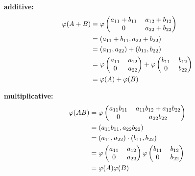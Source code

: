 \begin{enumerate}
      \textbf{additive:}
      \begin{align*}
         \varphi(A + B) &= \varphi\left(\begin{tabular}{@{}cc@{}}
            $a_{11} + b_{11}$ & $a_{12} + b_{12}$ \\
            0  & $a_{22} + b_{22}$
         \end{tabular}\right) \\
         &= (a_{11} + b_{11}, a_{22} + b_{22}) \\
         &= (a_{11}, a_{22}) + (b_{11}, b_{22}) \\
         &= \varphi\left(\begin{tabular}{@{}cc@{}}
            $a_{11}$ & $a_{12}$ \\
            0 & $a_{22}$
         \end{tabular}\right) + \varphi\left(\begin{tabular}{@{}cc@{}}
            $b_{11}$ & $b_{12}$ \\
            0 & $b_{22}$
         \end{tabular}\right) \\
         &= \varphi(A) + \varphi(B)
      \end{align*}
      
      \textbf{multiplicative:}
      \begin{align*}
         \varphi(AB) &= \varphi\left(\begin{tabular}{@{}cc@{}}
            $a_{11}b_{11}$ & $a_{11}b_{12} + a_{12}b_{22}$  \\
            0  & $a_{22}b_{22}$
         \end{tabular}\right) \\
         &= (a_{11}b_{11}, a_{22}b_{22}) \\
         &= (a_{11}, a_{22}) \cdot (b_{11}, b_{22}) \\
         &= \varphi\left(\begin{tabular}{@{}cc@{}}
            $a_{11}$ & $a_{12}$ \\
            0 & $a_{22}$
         \end{tabular}\right)\varphi\left(\begin{tabular}{@{}cc@{}}
            $b_{11}$ & $b_{12}$ \\
            0 & $b_{22}$
         \end{tabular}\right) \\
         &= \varphi(A)\varphi(B)
      \end{align*}
      

\end{enumerate}
